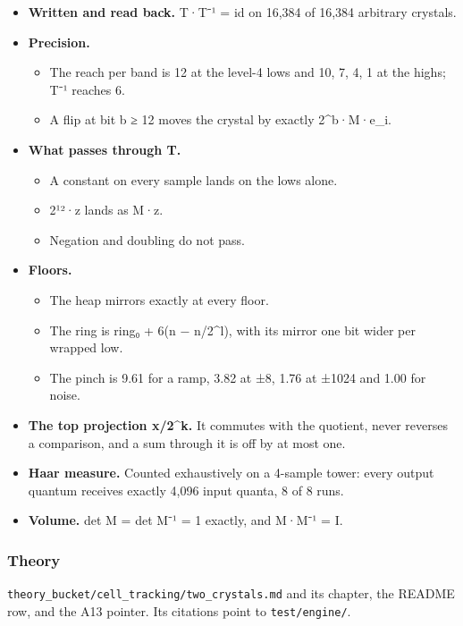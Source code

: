 \begin{itemize}
\item \textbf{Written and read back.} T·T⁻¹ = id on 16,384 of 16,384 arbitrary crystals.
\item \textbf{Precision.}

\begin{itemize}
\item The reach per band is 12 at the level-4 lows and 10, 7, 4, 1 at the highs; T⁻¹ reaches 6.
\item A flip at bit b ≥ 12 moves the crystal by exactly 2\textasciicircum{}b·M·e\_\allowbreak{}i.
\end{itemize}
\item \textbf{What passes through T.}

\begin{itemize}
\item A constant on every sample lands on the lows alone.
\item 2¹²·z lands as M·z.
\item Negation and doubling do not pass.
\end{itemize}
\item \textbf{Floors.}

\begin{itemize}
\item The heap mirrors exactly at every floor.
\item The ring is ring₀ + 6(n − n/2\textasciicircum{}l), with its mirror one bit wider per wrapped low.
\item The pinch is 9.61 for a ramp, 3.82 at ±8, 1.76 at ±1024 and 1.00 for noise.
\end{itemize}
\item \textbf{The top projection x/2\textasciicircum{}k.} It commutes with the quotient, never reverses a comparison, and a sum through it is off by at most one.
\item \textbf{Haar measure.} Counted exhaustively on a 4-sample tower: every output quantum receives exactly 4,096 input quanta, 8 of 8 runs.
\item \textbf{Volume.} det M = det M⁻¹ = 1 exactly, and M·M⁻¹ = I.
\end{itemize}

\subsubsection{\texorpdfstring{Theory}{Theory}}

\texttt{theory\_\allowbreak{}bucket/\allowbreak{}cell\_\allowbreak{}tracking/\allowbreak{}two\_\allowbreak{}crystals.\allowbreak{}md} and its chapter, the README row, and the A13 pointer. Its citations point to \texttt{test/\allowbreak{}engine/\allowbreak{}}.

